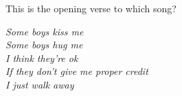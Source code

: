 This is the opening verse to which song?
\begin{center}
    \begin{minipage}{0.6\textwidth}
        \textit{%
            Some boys kiss me \\
            Some boys hug me \\
            I think they're ok \\
            If they don't give me proper credit \\
            I just walk away}%
    \end{minipage}
\end{center}
